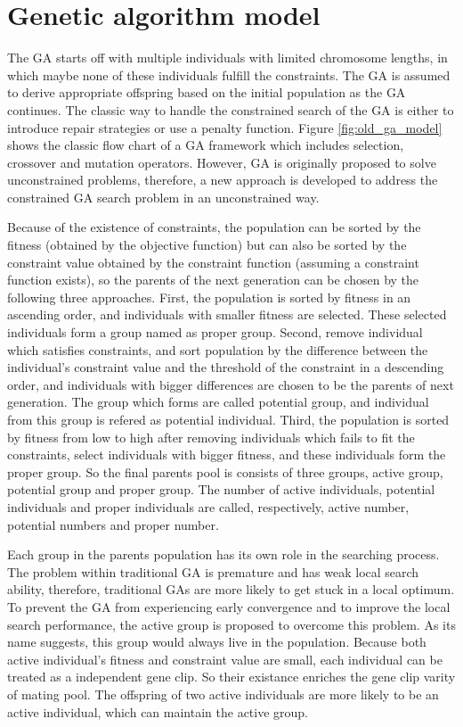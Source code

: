 \section{Genetic algorithm model}



The GA starts off with multiple individuals with limited chromosome lengths, in
which maybe none of these individuals fulfill the constraints. The GA is
assumed to derive appropriate offspring based on the initial population as the
GA continues. The classic way to handle the constrained search of the GA is
either to introduce repair strategies or use a penalty function. Figure
\ref{fig:old_ga_model} shows the classic flow chart of a GA framework which
includes selection, crossover and mutation operators. However, GA is originally
proposed to solve unconstrained problems, therefore, a new approach is
developed to address the constrained GA search problem in an unconstrained way. 

Because of the existence of constraints, the population can be sorted by the
fitness (obtained by the objective function) but can also be sorted by the
constraint value obtained by the constraint function (assuming a constraint
function exists), so the parents of the next generation can be chosen by the
following three approaches. First, the population is sorted by fitness in an
ascending order, and individuals with smaller fitness are selected. These
selected individuals form a group named as proper group. Second, remove
individual which satisfies constraints, and sort population  by the difference
between the individual's constraint value and the threshold of the constraint
in a descending order, and individuals with bigger differences are chosen to be
the parents of next generation. The group which forms are called potential
group, and individual from this group is refered as  potential individual.
Third, the population is sorted by fitness from low to high after removing
individuals which fails to fit the constraints, select individuals with bigger
fitness, and these individuals form the proper group.  So the final parents
pool is consists of three groups, active group, potential group and proper
group.  The number of active individuals, potential individuals and proper
individuals are called, respectively, active number, potential numbers and
proper number. 

Each group in the parents population has its own role in the searching
process.  The problem within traditional GA is premature and has weak local
search ability, therefore, traditional GAs are more likely to get stuck in a
local optimum. To prevent the GA from experiencing early convergence and to
improve the local search performance, the active group is proposed to overcome
this problem. As its name suggests, this group would always live in the
population.  Because both active individual's fitness and constraint value are small,
each individual can be treated as a independent gene clip. So their existance
enriches the gene clip varity of mating pool. The offspring of two active
individuals are more likely to be an active individual, which can maintain the
active group.


